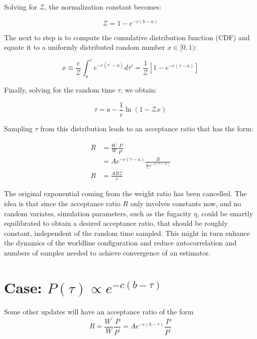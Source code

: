 \documentclass[12pt, two sided]{article}
\begin{document}
Solving for $\mathcal{Z}$, the normalization constant becomes:

\begin{equation}
\mathcal{Z} = 1 - e^{-c(b-a)}
\end{equation}

The next to step is to compute the cumulative distribution function (CDF) and equate it to a uniformly distributed random number $x\in[0,1)$:

\begin{equation}
x \equiv \frac{c}{\mathcal{Z}} \int_{a}^{\tau} e^{-c(\tau^\prime-a)} d\tau\prime = \frac{1}{\mathcal{Z}}[1-e^{-c(\tau-a)}]
\end{equation}

Finally, solving for the random time $\tau$, we obtain:

\begin{equation}
\tau = a - \frac{1}{c} \ln(1-\mathcal{Z}x)
\end{equation}

Sampling $\tau$ from this distribution leads to an acceptance ratio that has the form:

\begin{align}
R &= \frac{W^\prime}{W} \frac{P}{P^\prime} \\
&= A e^{-c(\tau-a)} \frac{B}{\frac{c}{\mathcal{Z}}e^{-c(\tau-a)}} \\
R &= \frac{A B \mathcal{Z}}{c} 
\end{align}

The original exponential coming from the weight ratio has been cancelled. The idea is that since the acceptance ratio $R$ only involves constants now, and no random variates, simulation parameters, such as the fugacity $\eta$, could be smartly equilibrated to obtain a desired acceptance ratio, that should be roughly constant, independent of the random time sampled. This might in turn enhance the dynamics of the worldline configuration and reduce autocorrelation and numbers of samples needed to achieve convergence of an estimator.


\section{Case: $P(\tau) \propto e^{-c(b-\tau)}$}

Some other updates will have an acceptance ratio of the form
\begin{equation}
R =  \frac{W^\prime}{W} \frac{P}{P^\prime} = Ae^{-c(b-\tau)} \frac{P}{P^\prime}
\end{equation}
\end{document}
